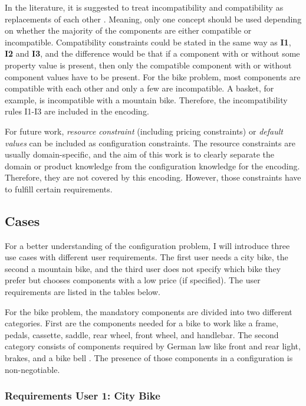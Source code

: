 In the literature, it is suggested to treat incompatibility and compatibility as replacements of each other \cite{hofestrybawo14a}. Meaning, only one concept should be used depending on whether the majority of the components are either compatible or incompatible. 
Compatibility constraints could be stated in the same way as \textbf{I1},  \textbf{I2} and \textbf{I3}, and the difference would be that if a component with or without some property value is present, then only the compatible component with or without component values have to be present.
For the bike problem, most components are compatible with each other and only a few are incompatible.
A basket, for example, is incompatible with a mountain bike. 
Therefore, the incompatibility rules I1-I3 are included in the encoding. \newline

For future work, \textit{resource constraint} (including pricing constraints) or \textit{default values} can be included as configuration constraints. The resource constraints are usually domain-specific, and the aim of this work is to clearly separate the domain or product knowledge from the configuration knowledge for the encoding. Therefore, they are not covered by this encoding. However, those constraints have to fulfill certain requirements. \newline

\subsection{Cases}
For a better understanding of the configuration problem, I will introduce three use cases with different user requirements. The first user needs a city bike, the second a mountain bike, and the third user does not specify which bike they prefer but chooses components with a low price (if specified). The user requirements are listed in the tables below. \newline

For the bike problem, the mandatory components are divided into two different categories. First are the components needed for a bike to work like a frame, pedals, cassette, saddle, rear wheel, front wheel, and handlebar. The second category consists of components required by German law like front and rear light, brakes, and a bike bell \cite{stvzo}. The presence of those components in a configuration is non-negotiable.

\subsubsection{Requirements User 1: City Bike}

